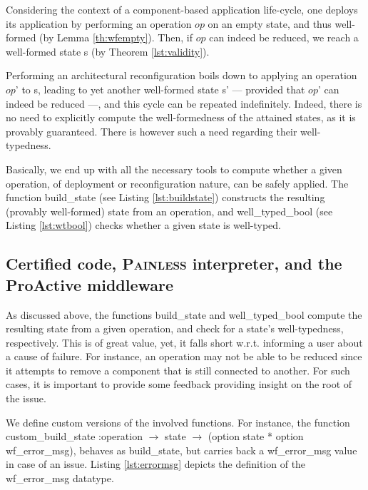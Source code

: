 	Considering the context of a component-based application
	life-cycle, one deploys its application by performing an operation $op$ on an
	empty \textsf{state}, and thus well-formed (by Lemma \ref{th:wfempty}). Then, if $op$ can indeed
	be reduced, we reach a well-formed \textsf{state s} (by Theorem \ref{lst:validity}). 
		

	Performing an architectural reconfiguration boils 
	down to applying an \textsf{operation} $op$' to \textsf{s}, leading to yet another
	well-formed \textsf{state s'} --- provided that $op$' can indeed be reduced ---, and
	this cycle can be repeated indefinitely. Indeed, there is no need to explicitly compute the 
	well-formedness of the attained \textsf{states}, as it is provably guaranteed. 
	There is however such a need regarding their well-typedness.
		
	 Basically, we end up with all the necessary tools to compute whether a given \textsf{operation},
	 of deployment or reconfiguration nature, can be safely applied.  The function
	 \textsf{build\_state} (see Listing \ref{lst:buildstate}) constructs the resulting (provably well-formed) 
	 \textsf{state} from an \textsf{operation}, and \textsf{well\_typed\_bool} (see Listing \ref{lst:wtbool})
	 checks whether a given \textsf{state} is well-typed.	
	 
	 
\subsection{Certified code, \textsc{Painless} interpreter, and the ProActive middleware}
\label{sub:painlessproactive}

 
	As discussed above, the functions  \textsf{build\_state} and \textsf{well\_typed\_bool}
	compute the resulting \textsf{state} from a given \textsf{operation}, and
	check for a \textsf{state}'s well-typedness, respectively. This is of great value, yet,
	it falls short w.r.t. informing a user about a cause of failure. For instance, an
	\textsf{operation} may not be able to be reduced since it attempts to remove
	a \textsf{component} that is still connected to another. For such cases, it 
	is important to provide some feedback providing insight on the root of the issue.
		 
		 
	We define custom versions of the involved functions. For instance,	 
	the function \textsf{custom\_build\_state :operation $\rightarrow$ state $\rightarrow$ (option state * option wf\_error\_msg)},
	behaves as \textsf{build\_state}, but carries back a \textsf{wf\_error\_msg} value in case of an issue.	 
	Listing \ref{lst:errormsg} depicts the definition of the \textsf{wf\_error\_msg} datatype. 				
	 				
